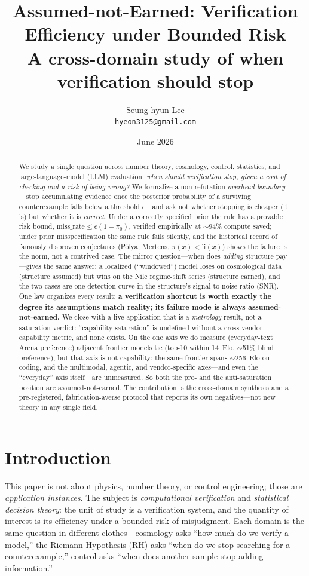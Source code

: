 \documentclass[11pt]{article}
\title{Assumed-not-Earned: Verification Efficiency under Bounded Risk\\
\large A cross-domain study of when verification should stop}
\author{Seung-hyun Lee\\ \texttt{hyeon3125@gmail.com}}
\date{June 2026}
\begin{document}
\maketitle

\begin{abstract}
We study a single question across number theory, cosmology, control, statistics,
and large-language-model (LLM) evaluation: \emph{when should verification stop,
given a cost of checking and a risk of being wrong?} We formalize a
non-refutation \emph{overhead boundary}---stop accumulating evidence once the
posterior probability of a surviving counterexample falls below a threshold
$\epsilon$---and ask not whether stopping is cheaper (it is) but whether it is
\emph{correct}. Under a correctly specified prior the rule has a provable risk
bound, $\mathrm{miss\_rate}\le\epsilon(1-\pi_0)$, verified empirically at
$\sim$94\% compute saved; under prior misspecification the same rule fails
silently, and the historical record of famously disproven conjectures
(P\'olya, Mertens, $\pi(x)<\mathrm{li}(x)$) shows the failure is the norm, not a
contrived case. The mirror question---when does \emph{adding} structure pay---gives
the same answer: a localized (``windowed'') model loses on cosmological data
(structure assumed) but wins on the Nile regime-shift series (structure earned),
and the two cases are one detection curve in the structure's signal-to-noise
ratio (SNR). One law organizes every result: \textbf{a verification shortcut is
worth exactly the degree its assumptions match reality; its failure mode is always
assumed-not-earned.} We close with a live application that is a \emph{metrology}
result, not a saturation verdict: ``capability saturation'' is undefined without a
cross-vendor capability metric, and none exists. On the one axis we do measure
(everyday-text Arena preference) adjacent frontier models tie (top-10 within
14~Elo, $\sim$51\% blind preference), but that axis is not capability: the same
frontier spans $\sim$256~Elo on coding, and the multimodal, agentic, and
vendor-specific axes---and even the ``everyday'' axis itself---are unmeasured. So
both the pro- and the anti-saturation position are assumed-not-earned. The
contribution is the cross-domain synthesis and a pre-registered, fabrication-averse
protocol that reports its own negatives---not new theory in any single field.
\end{abstract}

\section{Introduction}
This paper is not about physics, number theory, or control engineering; those are
\emph{application instances}. The subject is \emph{computational verification} and
\emph{statistical decision theory}: the unit of study is a verification system, and
the quantity of interest is its efficiency under a bounded risk of misjudgment.
Each domain is the same question in different clothes---cosmology asks ``how much
do we verify a model,'' the Riemann Hypothesis (RH) asks ``when do we stop
searching for a counterexample,'' control asks ``when does another sample stop
adding information.''
\end{document}
